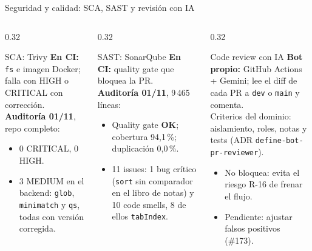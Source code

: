 \begin{frame}{Seguridad y calidad: SCA, SAST y revisión con IA}
\begin{columns}[T,onlytextwidth]
\begin{column}{0.32\textwidth}
\begin{block}{SCA: Trivy}
\scriptsize
\textbf{En CI:} \texttt{fs} e imagen Docker; falla con HIGH o CRITICAL con corrección.\\[0.15cm]
\textbf{Auditoría 01/11}, repo completo:
\begin{itemize}
  \item 0 CRITICAL, 0 HIGH.
  \item 3 MEDIUM en el backend: \texttt{glob}, \texttt{minimatch} y \texttt{qs}, todas con versión corregida.
\end{itemize}
\end{block}
\end{column}
\begin{column}{0.32\textwidth}
\begin{block}{SAST: SonarQube}
\scriptsize
\textbf{En CI:} quality gate que bloquea la PR.\\[0.15cm]
\textbf{Auditoría 01/11}, 9\,465 líneas:
\begin{itemize}
  \item Quality gate \textbf{OK}; cobertura 94,1\,\%; duplicación 0,0\,\%.
  \item 11 issues: 1 bug crítico (\texttt{sort} sin comparador en el libro de notas) y 10 code smells, 8 de ellos \texttt{tabIndex}.
\end{itemize}
\end{block}
\end{column}
\begin{column}{0.32\textwidth}
\begin{block}{Code review con IA}
\scriptsize
\textbf{Bot propio:} GitHub Actions + Gemini; lee el diff de cada PR a \texttt{dev} o \texttt{main} y comenta.\\[0.15cm]
Criterios del dominio: aislamiento, roles, notas y tests (ADR \texttt{define-bot-pr-reviewer}).
\begin{itemize}
  \item No bloquea: evita el riesgo R-16 de frenar el flujo.
  \item Pendiente: ajustar falsos positivos (\#173).
\end{itemize}
\end{block}
\end{column}
\end{columns}
\vspace{0.2cm}
\centering
{}
\end{frame}

